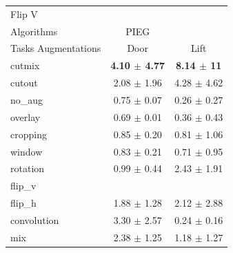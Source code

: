\begin{tabular}{lcc}
Flip V & & \\
Algorithms & PIEG & \\
Tasks Augmentations & Door & Lift \\
cutmix          & \textbf{4.10 $\pm$ 4.77} & \textbf{8.14 $\pm$ 11} \\
cutout          & 2.08 $\pm$ 1.96 & 4.28 $\pm$ 4.62 \\
no\_aug         & 0.75 $\pm$ 0.07 & 0.26 $\pm$ 0.27 \\
overlay         & 0.69 $\pm$ 0.01 & 0.36 $\pm$ 0.43 \\
cropping        & 0.85 $\pm$ 0.20 & 0.81 $\pm$ 1.06 \\
window          & 0.83 $\pm$ 0.21 & 0.71 $\pm$ 0.95 \\
rotation        & 0.99 $\pm$ 0.44 & 2.43 $\pm$ 1.91 \\
flip\_v         &  &  \\
flip\_h         & 1.88 $\pm$ 1.28 & 2.12 $\pm$ 2.88 \\
convolution     & 3.30 $\pm$ 2.57 & 0.24 $\pm$ 0.16 \\
mix             & 2.38 $\pm$ 1.25 & 1.18 $\pm$ 1.27 \\
\end{tabular}